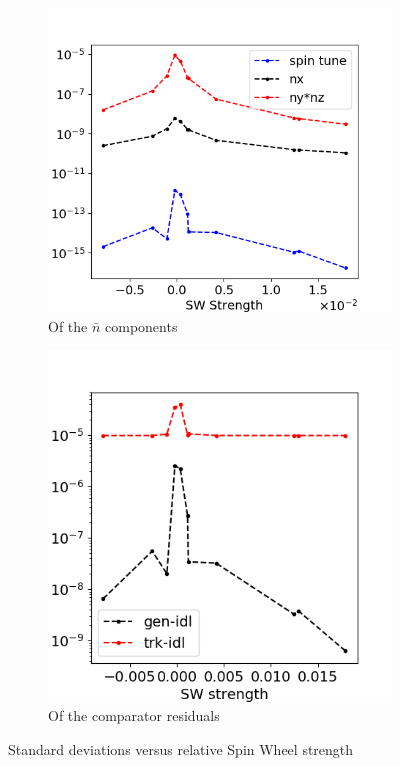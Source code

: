 \documentclass[a4paper]{jacow}
\newcommand{\nbar}{\bar n}
\begin{document}
\begin{figure}[h]
  \centering
  \begin{subfigure}{\linewidth}
    \centering
    \includegraphics[width=\linewidth]{../img/IPAC19/NBAR_variation_sd_vs_SW}
    \caption{Of the $\nbar$ components\label{fig:sd:nbar}}
  \end{subfigure}
  \begin{subfigure}{\linewidth}
    \centering
    \includegraphics[width=\linewidth]{../img/IPAC19/residual_SD_vs_SW(both)}
    \caption{Of the comparator residuals\label{fig:sd:res}}
  \end{subfigure}
  \caption{Standard deviations versus relative Spin Wheel strength\label{fig:sd}}
\end{figure}
\end{document}

